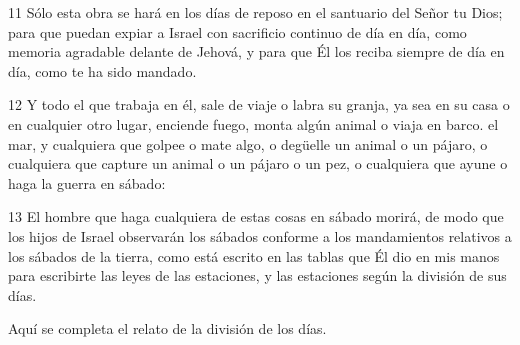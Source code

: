 \par 11 Sólo esta obra se hará en los días de reposo en el santuario del Señor tu Dios; para que puedan expiar a Israel con sacrificio continuo de día en día, como memoria agradable delante de Jehová, y para que Él los reciba siempre de día en día, como te ha sido mandado.
\par 12 Y todo el que trabaja en él, sale de viaje o labra su granja, ya sea en su casa o en cualquier otro lugar, enciende fuego, monta algún animal o viaja en barco. el mar, y cualquiera que golpee o mate algo, o degüelle un animal o un pájaro, o cualquiera que capture un animal o un pájaro o un pez, o cualquiera que ayune o haga la guerra en sábado:
\par 13 El hombre que haga cualquiera de estas cosas en sábado morirá, de modo que los hijos de Israel observarán los sábados conforme a los mandamientos relativos a los sábados de la tierra, como está escrito en las tablas que Él dio en mis manos para escribirte las leyes de las estaciones, y las estaciones según la división de sus días.
\par    
\par     Aquí se completa el relato de la división de los días.

